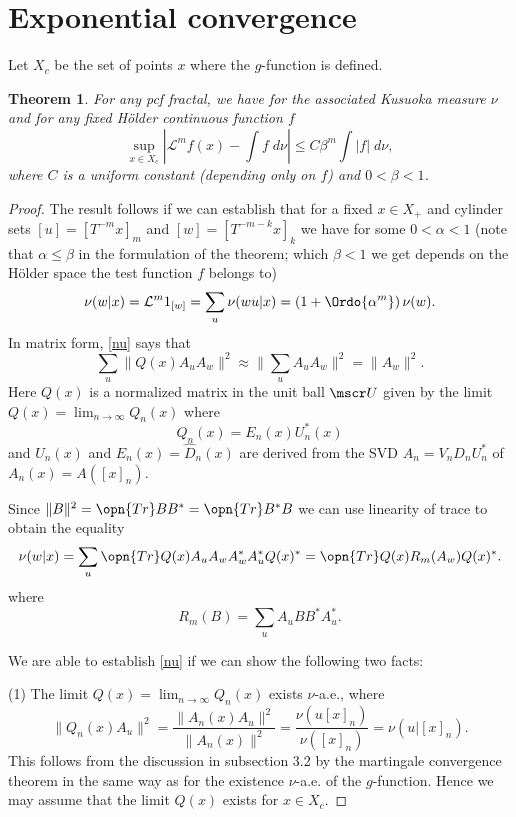 \documentclass[11pt]{scrartcl}
\theoremstyle{plain} %
\newtheorem{thm}{Theorem}%
\theoremstyle{definition}
\begin{document}
\section{Exponential convergence}
Let $X_c$ be the set of points $x$ where the $g$-function is defined.
\begin{thm}
For any pcf fractal, we have for the associated Kusuoka measure $\nu$ and for any fixed H\"older continuous function $f$
$$\sup_{x\in X_c} |{\mathcal L}^m f(x)-\int f\; d\nu|\leq C\beta^m\int |f|\; d\nu,$$
where $C$ is a uniform constant (depending only on $f$) and $0<\beta<1$.
\end{thm}

\begin{proof}
The result follows if we can establish that for a fixed $x\in X_+$ and cylinder sets $[u]=[T^{-m} x]_m$ and $[w]=[T^{-m-k} x]_k$ we have for some $0<\alpha<1$ (note that $\alpha\leq \beta$ in the formulation of the theorem; which $\beta<1$ we get depends on the H\"older space the test function $f$ belongs to)
\begin{equation}\label{nu}
\nu(w|x)={\mathcal L}^m 1_{[w]}=\sum_u \nu(wu|x)=\left(1+\Ordo {\alpha^m}\right)\nu(w).
\end{equation} 
In matrix form, \eqref{nu} says that
\begin{equation}\label{XXX}
   \sum_u \| Q(x) A_u A_w \|^2 \approx \| \sum_u A_u A_w \|^2 = \| A_w \|^2.
\end{equation}
Here $Q(x)$ is a normalized matrix in the unit ball $\mscr U$ given by
the limit $Q(x)=\lim_{n\to\infty} Q_n(x)$ where 
$$ Q_n(x)=E_n(x)U_n^*(x) $$
and $U_n(x)$ and $E_n(x)=\hat D_n(x)$ are derived from the SVD $A_n=V_n D_n U^*_n$ of
$A_n(x)=A([x]_n)$.

Since $\| B \|^2 = \opn{Tr} B B^* = \opn{Tr} B^* B$ we can use linearity of trace
to obtain the equality
\begin{equation} \label{XX1}
  \nu(w|x) = \sum_u \opn{Tr} Q(x) A_u A_w A_w^* A_u^* Q(x)^*
  = \opn{Tr} Q(x) R_m(A_w) Q(x)^*. 
\end{equation}
where 
$$ R_m(B) =  \sum_u A_u B B^* A_u^*. $$

We are able to establish \eqref{nu} if we can show the following two facts:

(1) The limit $Q(x)=\lim_{n\to \infty} Q_n(x)$ exists $\nu$-a.e., where
$$\|Q_n(x)A_u\|^2=\frac{\|A_n(x)A_u\|^2}{\|A_n(x)\|^2}=\frac{\nu(u[x]_n)}{\nu([x]_n)}=\nu(u|[x]_n).$$
This follows from the discussion in subsection 3.2 by the martingale convergence theorem in the same way as for the existence $\nu$-a.e. of the $g$-function. Hence we may assume that the limit $Q(x)$ exists for $x\in X_c$.


\end{proof}
\end{document}
